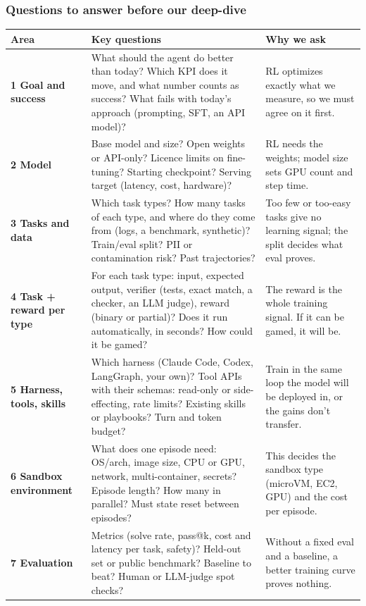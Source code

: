 \begin{frame}
\frametitle{Questions to answer before our deep-dive}
\vspace{-1mm}
\fontsize{6.2}{7.3}\selectfont
\renewcommand{\arraystretch}{1.12}
\begin{tabularx}{\textwidth}{@{}>{\raggedright\arraybackslash}p{24mm}>{\raggedright\arraybackslash}X>{\raggedright\arraybackslash}p{44mm}@{}}
\toprule
\textcolor{awsteal}{\textbf{Area}} & \textcolor{awsteal}{\textbf{Key questions}} & \textcolor{awsteal}{\textbf{Why we ask}}\\
\midrule
\textbf{1\; Goal and success} & What should the agent do better than today? Which KPI does it move, and what number counts as success? What fails with today's approach (prompting, SFT, an API model)? & RL optimizes exactly what we measure, so we must agree on it first.\\
\textbf{2\; Model} & Base model and size? Open weights or API-only? Licence limits on fine-tuning? Starting checkpoint? Serving target (latency, cost, hardware)? & RL needs the weights; model size sets GPU count and step time.\\
\textbf{3\; Tasks and data} & Which task types? How many tasks of each type, and where do they come from (logs, a benchmark, synthetic)? Train/eval split? PII or contamination risk? Past trajectories? & Too few or too-easy tasks give no learning signal; the split decides what eval proves.\\
\textbf{4\; Task + reward per type} & For each task type: input, expected output, verifier (tests, exact match, a checker, an LLM judge), reward (binary or partial)? Does it run automatically, in seconds? How could it be gamed? & The reward is the whole training signal. If it can be gamed, it will be.\\
\textbf{5\; Harness, tools, skills} & Which harness (Claude Code, Codex, LangGraph, your own)? Tool APIs with their schemas: read-only or side-effecting, rate limits? Existing skills or playbooks? Turn and token budget? & Train in the same loop the model will be deployed in, or the gains don't transfer.\\
\textbf{6\; Sandbox environment} & What does one episode need: OS/arch, image size, CPU or GPU, network, multi-container, secrets? Episode length? How many in parallel? Must state reset between episodes? & This decides the sandbox type (microVM, EC2, GPU) and the cost per episode.\\
\textbf{7\; Evaluation} & Metrics (solve rate, pass@k, cost and latency per task, safety)? Held-out set or public benchmark? Baseline to beat? Human or LLM-judge spot checks? & Without a fixed eval and a baseline, a better training curve proves nothing.\\

\end{tabularx}
\end{frame}
